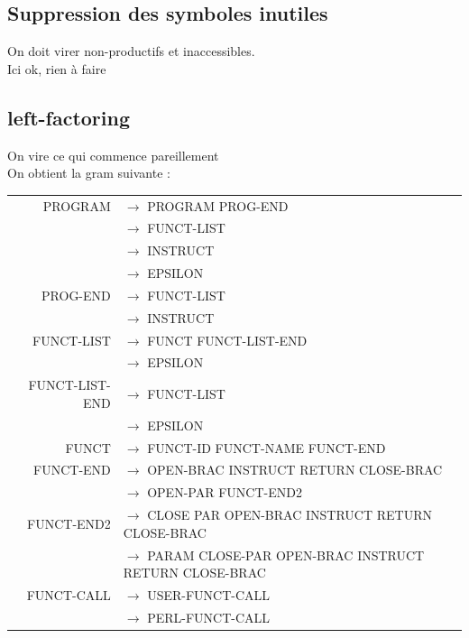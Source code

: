 \documentclass[a4paper,10pt]{article}
\begin{document}
\subsection{Suppression des symboles inutiles}
On doit virer non-productifs et inaccessibles.\\
Ici ok, rien à faire







\subsection{left-factoring}
On vire ce qui commence pareillement~\\

On obtient la gram suivante : 

\hspace{-3.5cm}\begin{tabular}{rl}
PROGRAM				& $\rightarrow$ PROGRAM PROG-END \\
					& $\rightarrow$ FUNCT-LIST\\
					& $\rightarrow$ INSTRUCT\\
					& $\rightarrow$ EPSILON\\
PROG-END			& $\rightarrow$ FUNCT-LIST\\
					& $\rightarrow$ INSTRUCT\\
					
FUNCT-LIST			& $\rightarrow$ FUNCT FUNCT-LIST-END\\
					& $\rightarrow$ EPSILON\\
					
FUNCT-LIST-END		& $\rightarrow$ FUNCT-LIST\\
					& $\rightarrow$ EPSILON\\
					
FUNCT				& $\rightarrow$ FUNCT-ID FUNCT-NAME FUNCT-END \\

FUNCT-END			& $\rightarrow$ OPEN-BRAC INSTRUCT RETURN CLOSE-BRAC \\
					& $\rightarrow$ OPEN-PAR FUNCT-END2 \\

FUNCT-END2			& $\rightarrow$ CLOSE PAR OPEN-BRAC INSTRUCT RETURN CLOSE-BRAC \\
					& $\rightarrow$ PARAM CLOSE-PAR OPEN-BRAC INSTRUCT RETURN CLOSE-BRAC \\

FUNCT-CALL			& $\rightarrow$ USER-FUNCT-CALL \\
					& $\rightarrow$ PERL-FUNCT-CALL \\


\end{tabular}
\end{document}
